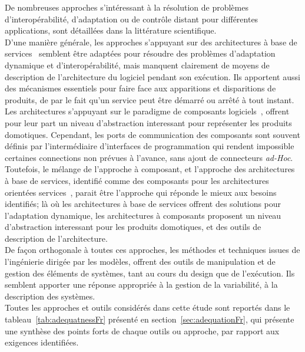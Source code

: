 De nombreuses approches s'intéressant à la résolution de problèmes d'interopérabilité, d'adaptation ou de contrôle distant pour différentes applications, sont détaillées dans la littérature scientifique.\\
D'une manière générale, les approches s'appuyant sur des architectures à base de services~\cite{OSGI:r4,Chappell:2004} semblent être adaptées pour résoudre des problèmes d'adaptation dynamique et d'interopérabilité, mais manquent clairement de moyens de description de l'architecture du logiciel pendant son exécution. Ils apportent aussi des mécanismes essentiels pour faire face aux apparitions et disparitions de produits, de par le fait qu'un service peut être démarré ou arrêté à tout instant.\\
Les architectures s'appuyant sur le paradigme de composants logiciels~\cite{Georgiadis:2002,RobVanOmmering:2000,Bruneton:2006}, offrent pour leur part un niveau d'abstraction interessant pour représenter les produits domotiques. Cependant, les ports de communication des composants sont souvent définis par l'intermédiaire d'interfaces de programmation qui rendent impossible certaines connections non prévues à l'avance, sans ajout de connecteurs {\it ad-Hoc}.\\
Toutefois, le mélange de l'approche à composant, et l'approche des architectures à base de services, identifié comme des composants pour les architectures orientées services~\cite{sca:specs,Melisson:2010,Escoffier:2007}, parait être l'approche qui réponde le mieux aux besoins identifiés; là où les architectures à base de services offrent des solutions pour l'adaptation dynamique, les architectures à composants proposent un niveau d'abstraction interessant pour les produits domotiques, et des outils de description de l'architecture.\\
De façon orthogonale à toutes ces approches, les méthodes et techniques issues de l'ingénierie dirigée par les modèles, offrent des outils de manipulation et de gestion des éléments de systèmes, tant au cours du design que de l'exécution. Ils semblent apporter une réponse appropriée à la gestion de la variabilité, à la description des systèmes.\\

Toutes les approches et outils considérés dans cette étude sont reportés dans le tableau~\ref{tab:adequatnessFr} présenté en section~\ref{sec:adequationFr}, qui présente une synthèse des points forts de chaque outils ou approche, par rapport aux exigences identifiées.


